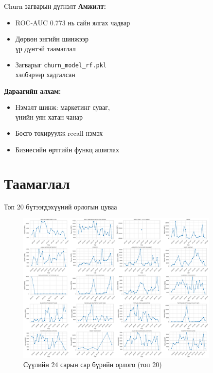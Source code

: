 \documentclass{beamer}
\begin{document}
\begin{frame}{Churn загварын дүгнэлт}
\small
\textbf{Амжилт:}
\begin{itemize}
    \item ROC-AUC 0.773 нь сайн ялгах чадвар
    \item Дөрвөн энгийн шинжээр\\үр дүнтэй таамаглал
    \item Загварыг \texttt{churn\_model\_rf.pkl}\\хэлбэрээр хадгалсан
\end{itemize}

\vspace{0.2cm}
\textbf{Дараагийн алхам:}
\begin{itemize}
    \item Нэмэлт шинж: маркетинг суваг,\\үнийн уян хатан чанар
    \item Босго тохируулж recall нэмэх
    \item Бизнесийн өртгийн функц ашиглах
\end{itemize}
\end{frame}

\section{Таамаглал}

\begin{frame}{Топ 20 бүтээгдэхүүний орлогын цуваа}
\begin{figure}
    \centering
    \includegraphics[width=0.9\textwidth]{top20_monthly_revenue_trends.png}
    \caption{Сүүлийн 24 сарын сар бүрийн орлого (топ 20)}
\end{figure}
\end{frame}
\end{document}
